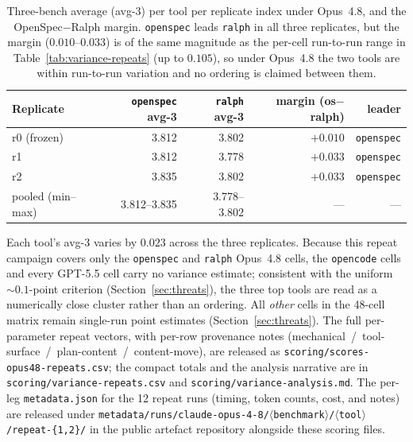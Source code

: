 \begin{table}[h]
\centering
\caption{Three-bench average (avg-3) per tool per replicate index under
Opus~4.8, and the OpenSpec$-$Ralph margin. \texttt{openspec} leads \texttt{ralph}
in all three replicates, but the margin ($0.010$--$0.033$) is of the same
magnitude as the per-cell run-to-run range in
Table~\ref{tab:variance-repeats} (up to $0.105$), so under Opus~4.8 the two
tools are within run-to-run variation and no ordering is claimed between them.}
\label{tab:variance-avg3}
\begin{tabular}{l rrr r}
\toprule
Replicate & \texttt{openspec} avg-3 & \texttt{ralph} avg-3 & margin (os$-$ralph) & leader \\
\midrule
r0 (frozen) & 3.812 & 3.802 & $+0.010$ & \texttt{openspec} \\
r1          & 3.812 & 3.778 & $+0.033$ & \texttt{openspec} \\
r2          & 3.835 & 3.802 & $+0.033$ & \texttt{openspec} \\
\midrule
pooled (min--max) & 3.812--3.835 & 3.778--3.802 & --- & --- \\
\bottomrule
\end{tabular}
\end{table}

Each tool's avg-3 varies by $0.023$ across the three replicates. Because this
repeat campaign covers only the \texttt{openspec} and \texttt{ralph} Opus~4.8
cells, the \texttt{opencode} cells and every GPT-5.5 cell carry no variance
estimate; consistent with the uniform ${\sim}0.1$-point criterion
(Section~\ref{sec:threats}), the three top tools are read as a numerically close
cluster rather than an ordering. All \emph{other} cells in the 48-cell matrix
remain single-run point estimates (Section~\ref{sec:threats}). The full
per-parameter repeat vectors, with per-row provenance notes
(mechanical~/~tool-surface~/~plan-content~/~content-move), are released as
\texttt{scoring/scores-opus48-repeats.csv}; the compact totals and the analysis
narrative are in \texttt{scoring/variance-repeats.csv} and
\texttt{scoring/variance-analysis.md}. The per-leg \texttt{metadata.json} for the
12 repeat runs (timing, token counts, cost, and notes) are released under
\texttt{metadata/runs/claude-opus-4-8/$\langle$benchmark$\rangle$/$\langle$tool$\rangle$/repeat-\{1,2\}/}
in the public artefact repository alongside these scoring files.

\FloatBarrier
